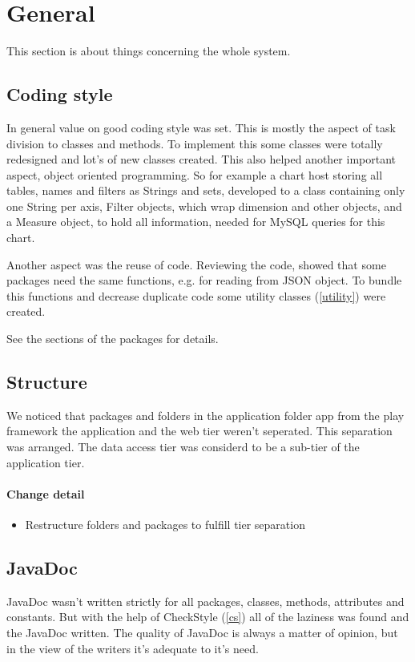 \section{General}
This section is about things concerning the whole system.

\subsection{Coding style}
In general value on good coding style was set. This is mostly the aspect
of task division to classes and methods. To implement this some classes were totally redesigned
and lot's of new classes created. This also helped another important aspect, object oriented programming.
So for example a chart host storing all tables, names and filters as Strings and sets, developed to
a class containing only one String per axis, Filter objects, which wrap dimension and other objects, and a Measure
object, to hold all information, needed for MySQL queries for this chart.

Another aspect was the reuse of code. Reviewing the code, showed that some packages need the same
functions, e.g. for reading from JSON object. To bundle this functions and
decrease duplicate code some utility classes (\ref{utility}) were created.

See the sections of the packages for details.

\subsection{Structure}
We noticed that packages and folders in the application folder app from the play framework 
the application and the web tier weren't seperated. This separation was arranged. 
The data access tier was considerd to be a sub-tier of the application tier. 

\paragraph{Change detail}
\begin{itemize}
  \item Restructure folders and packages to fulfill tier separation
\end{itemize}

\subsection{JavaDoc}
JavaDoc wasn't written strictly for all packages, classes, methods, attributes and constants. 
But with the help of CheckStyle (\ref{cs}) all of the laziness was found and the JavaDoc written.
The quality of JavaDoc is always a matter of opinion, but in the view of the
writers it's adequate to it's need.

